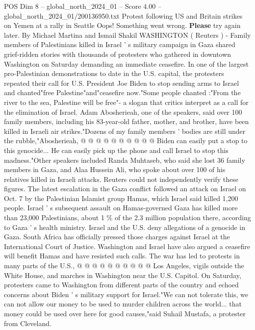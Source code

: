 \begin{textsample}{POS Dim 8 – global\_north\_2024\_01 – Score 4.00 – global\_north\_2024\_01/200136950.txt}  \label{ex:f8_pos_236}
Protest following US and Britain strikes on Yemen at a rally in Seattle Oops!
Something went wrong. \textbf{Please} try again later.
By Michael Martina and Ismail Shakil WASHINGTON ( Reuters ) - Family members of Palestinians killed in Israel ' s military campaign in Gaza shared grief-ridden stories with thousands of protesters who gathered in downtown Washington on Saturday demanding an immediate ceasefire.
In one of the largest pro-Palestinian demonstrations to date in the U.S. capital, the protesters repeated their call for U.S.
President Joe Biden to stop sending arms to Israel and chanted"free Palestine"and"ceasefire now."Some people chanted :"From the river to the sea, Palestine will be free"- a slogan that critics interpret as a call for the elimination of Israel.
Adam Abosherieah, one of the speakers, said over 100 family members, including his 83-year-old father, mother, and brother, have been killed in Israeli air strikes."Dozens of my family members ' bodies are still under the rubble,"Abosherieah, @ @ @ @ @ @ @ @ @ @ Biden can easily put a stop to this genocide...
He can easily pick up the phone and call Israel to stop this madness."Other speakers included Randa Muhtaseb, who said she lost 36 family members in Gaza, and Alaa Hussein Ali, who spoke about over 100 of his relatives killed in Israeli attacks.
Reuters could not independently verify these figures.
The latest escalation in the Gaza conflict followed an attack on Israel on Oct. 7 by the Palestinian Islamist group Hamas, which Israel said killed 1,200 people.
Israel ' s subsequent assault on Hamas-governed Gaza has killed more than 23,000 Palestinians, about 1 \% of the 2.3 million population there, according to Gaza ' s health ministry.
Israel and the U.S. deny allegations of a genocide in Gaza.
South Africa has officially pressed those charges against Israel at the International Court of Justice.
Washington and Israel have also argued a ceasefire will benefit Hamas and have resisted such calls.
The war has led to protests in many parts of the U.S., @ @ @ @ @ @ @ @ @ @ Los Angeles, vigils outside the White House, and marches in Washington near the U.S.
Capitol.
On Saturday, protesters came to Washington from different parts of the country and echoed concerns about Biden ' s military support for Israel."We can not tolerate this, we can not allow our money to be used to murder children across the world... that money could be used over here for good causes,"said Suhail Mustafa, a protester from Cleveland.

\end{textsample}
